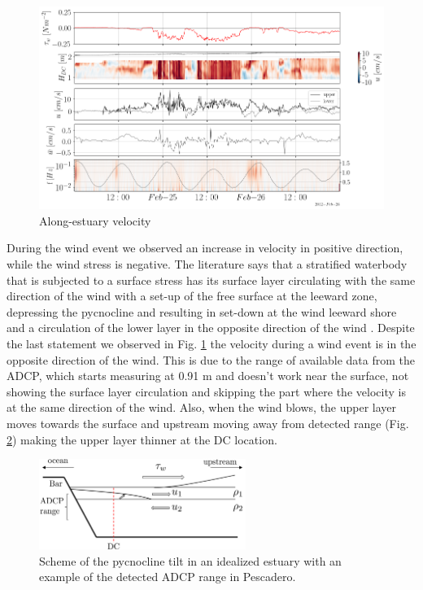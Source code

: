 \documentclass[tesis.tex]{subfiles}
\begin{document}
\begin{figure}[h!]
    \centering
    \includegraphics[width=\textwidth]{Imagenes/vel_wind.png}
    \caption{Along-estuary velocity }
    \label{fig:velwind}
\end{figure}

During the wind event we observed an increase in velocity in positive direction, while the wind stress is negative. The literature says that a stratified waterbody that is subjected to a surface stress has its surface layer circulating with the same direction of the wind with a set-up of the free surface at the leeward zone, depressing the pycnocline and resulting in set-down at the wind leeward shore and a circulation of the lower layer in the opposite direction of the wind \citep{Katopodes2018}. Despite the last statement we observed in Fig. \ref{fig:velwind} the velocity during a wind event is in the opposite direction of the wind. This is due to the range of available data from the ADCP, which starts measuring at 0.91 m and doesn't work near the surface, not showing the surface layer circulation and skipping the part where the velocity is at the same direction of the wind. Also, when the wind blows, the upper layer moves towards the surface and upstream moving away from detected range (Fig. \ref{fig:adcp}) making the upper layer thinner at the DC location.\\

\begin{figure}[h!]
    \centering
    \includegraphics[width=0.6\textwidth]{Imagenes/ADCP_range.png}
    \caption{Scheme of the pycnocline tilt in an idealized estuary with an example of the detected ADCP range in Pescadero.}
    \label{fig:adcp}
\end{figure}
\end{document}
